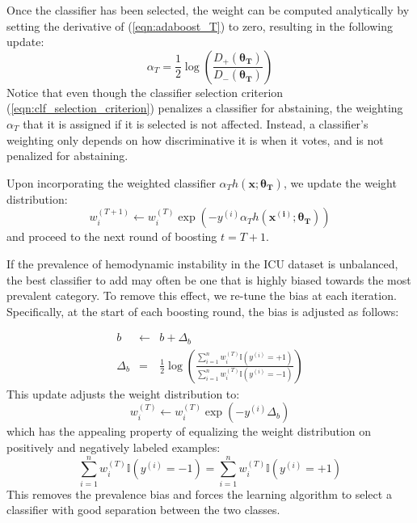 \documentclass[
   technote
]{phildoc}
\begin{document}
Once the classifier has been selected, the weight can be computed analytically by setting the derivative of (\ref{eqn:adaboost_T}) to zero, resulting in the following update:
\begin{equation}
\alpha_T = \frac{1}{2} \log\left(\frac{D_{+}(\bm{\theta_T})}{D_{-}(\bm{\theta_T})}\right)
\end{equation}
Notice that even though the classifier selection criterion (\ref{eqn:clf_selection_criterion}) penalizes a classifier for abstaining, the weighting $\alpha_T$ that it is assigned if it is selected is not affected.  Instead, a classifier's weighting only depends on how discriminative it is when it votes, and is not penalized for abstaining.

Upon incorporating the weighted classifier $\alpha_Th(\bm{x};\bm{\theta_T})$, we update the weight distribution:
\begin{equation}
w_i^{(T+1)} \gets w_i^{(T)} \exp\left(-y^{(i)} \alpha_T h(\bm{x^{(i)}};\bm{\theta_T})\right)
\end{equation}
and proceed to the next round of boosting $t=T+1$.

If the prevalence of hemodynamic instability in the ICU dataset is unbalanced, the best classifier to add may often be one that is highly biased towards the most prevalent category.  To remove this effect, we re-tune the bias at each iteration.  Specifically, at the start of each boosting round, the bias is adjusted as follows:

\begin{eqnarray}
b &\gets& b + \Delta_b \\
\Delta_b &=& \frac{1}{2}\log\left(\frac{\sum_{i=1}^n w_i^{(T)} \mathbb{I}(y^{(i)} = +1)}{\sum_{i=1}^n w_i^{(T)} \mathbb{I}(y^{(i)} = -1)}\right) \end{eqnarray}
This update adjusts the weight distribution to:
\begin{equation}
w_i^{(T)} \gets w_i^{(T)}\exp(-y^{(i)}\Delta_b)
\end{equation}
which has the appealing property of equalizing the weight distribution on positively and negatively labeled examples:
\begin{equation}
\sum_{i=1}^n w_i^{(T)} \mathbb{I}(y^{(i)} = -1) = \sum_{i=1}^n w_i^{(T)} \mathbb{I}(y^{(i)} = +1)
\end{equation}
This removes the prevalence bias and forces the learning algorithm to select a classifier with good separation between the two classes.
\end{document}
